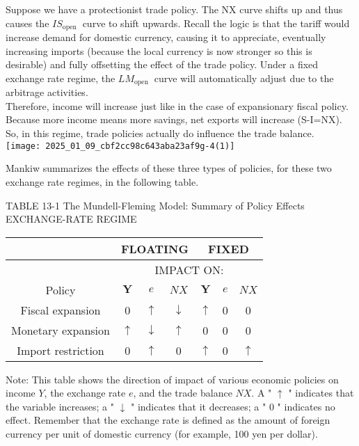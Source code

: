 \documentclass[10pt]{article}
\begin{document}
Suppose we have a protectionist trade policy. The NX curve shifts up and thus causes the $I S_{\text {open }}$ curve to shift upwards. Recall the logic is that the tariff would increase demand for domestic currency, causing it to appreciate, eventually increasing imports (because the local currency is now stronger so this is desirable) and fully offsetting the effect of the trade policy. Under a fixed exchange rate regime, the $L M_{\text {open }}$ curve will automatically adjust due to the arbitrage activities.\\
Therefore, income will increase just like in the case of expansionary fiscal policy. Because more income means more savings, net exports will increase (S-I=NX). So, in this regime, trade policies actually do influence the trade balance.\\
\texttt{[image: 2025\_01\_09\_cbf2cc98c643aba23af9g-4(1)]}

Mankiw summarizes the effects of these three types of policies, for these two exchange rate regimes, in the following table.

TABLE 13-1 The Mundell-Fleming Model: Summary of Policy Effects\\
EXCHANGE-RATE REGIME

\begin{center}
\begin{tabular}{|c|c|c|c|c|c|c|}
\hline
 & \multicolumn{3}{|c|}{FLOATING} & \multicolumn{3}{|c|}{FIXED} \\
\hline
 & \multicolumn{6}{|c|}{IMPACT ON:} \\
\hline
Policy & $\boldsymbol{Y}$ & $e$ & $N X$ & $\boldsymbol{Y}$ & $e$ & $N X$ \\
\hline
Fiscal expansion & 0 & $\uparrow$ & $\downarrow$ & $\uparrow$ & 0 & 0 \\
\hline
Monetary expansion & $\uparrow$ & $\downarrow$ & $\uparrow$ & 0 & 0 & 0 \\
\hline
Import restriction & 0 & $\uparrow$ & 0 & $\uparrow$ & 0 & $\uparrow$ \\
\hline
\end{tabular}
\end{center}

Note: This table shows the direction of impact of various economic policies on income $Y$, the exchange rate $e$, and the trade balance $N X$. A " $\uparrow$ " indicates that the variable increases; a " $\downarrow$ " indicates that it decreases; a " 0 " indicates no effect. Remember that the exchange rate is defined as the amount of foreign currency per unit of domestic currency (for example, 100 yen per dollar).
\end{document}
